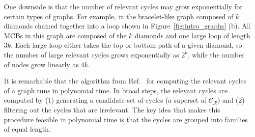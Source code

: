 \documentclass[fleqn,11pt]{article}
\newcommand\RelCyc{\mathcal{C_R}} %
\begin{document}
One downside is that the number of relevant cycles may grow exponentially for certain types of graphs.
For example, in the bracelet-like graph composed of $k$ diamonds chained together into a loop shown in Figure~\ref{fig:intro_graphs} (b). 
All MCBs in this graph are composed of the $k$ diamonds and one large loop of length $3k$. Each large loop either takes the top or bottom path of a given diamond, so the number of large relevant cycles grows exponentially as $2^k$, while the number of nodes grow linearly as $4k$.~\cite{vismaraUnion1997}
	
It is remarkable that the algorithm from Ref.~\cite{vismaraUnion1997} for computing the relevant cycles of a graph runs in polynomial time.
In broad steps, the relevant cycles are computed by (1) generating a candidate set of cycles (a superset of $\RelCyc$) and (2) filtering out the cycles that are irrelevant. The key idea that makes this procedure feasible in polynomial time is that the cycles are grouped into families of equal length. 

\end{document}
